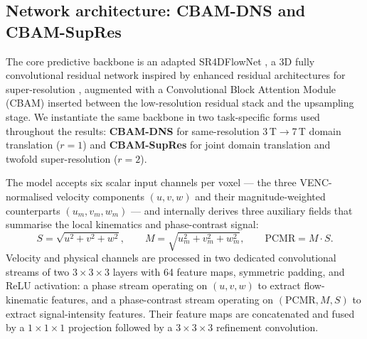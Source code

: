 \subsection*{Network architecture: CBAM-DNS and CBAM-SupRes}

The core predictive backbone is an adapted SR4DFlowNet
\cite{ferdian2020,elahmar2023}, a 3D fully convolutional residual
network inspired by enhanced residual architectures for super-resolution
\cite{lim2017edsr}, augmented with a Convolutional Block Attention
Module (CBAM) \cite{woo2018cbam} inserted between the low-resolution
residual stack and the upsampling stage. We instantiate the same
backbone in two task-specific forms used throughout the results:
\textbf{CBAM-DNS} for same-resolution 3\,T$\to$7\,T domain translation
($r=1$) and \textbf{CBAM-SupRes} for joint domain translation and
twofold super-resolution ($r=2$).

The model accepts six scalar input channels per voxel --- the three
VENC-normalised velocity components $(u, v, w)$ and their
magnitude-weighted counterparts $(u_m, v_m, w_m)$ --- and internally
derives three auxiliary fields that summarise the local kinematics and
phase-contrast signal:
\begin{equation}
    S = \sqrt{u^{2}+v^{2}+w^{2}},
    \qquad
    M = \sqrt{u_m^{2}+v_m^{2}+w_m^{2}},
    \qquad
    \mathrm{PCMR} = M \cdot S.
\end{equation}
Velocity and physical channels are processed in two dedicated
convolutional streams of two $3{\times}3{\times}3$ layers with 64
feature maps, symmetric padding, and ReLU activation: a phase stream
operating on $(u,v,w)$ to extract flow-kinematic features, and a
phase-contrast stream operating on $(\mathrm{PCMR}, M, S)$ to extract
signal-intensity features. Their feature maps are concatenated and
fused by a $1{\times}1{\times}1$ projection followed by a
$3{\times}3{\times}3$ refinement convolution.

